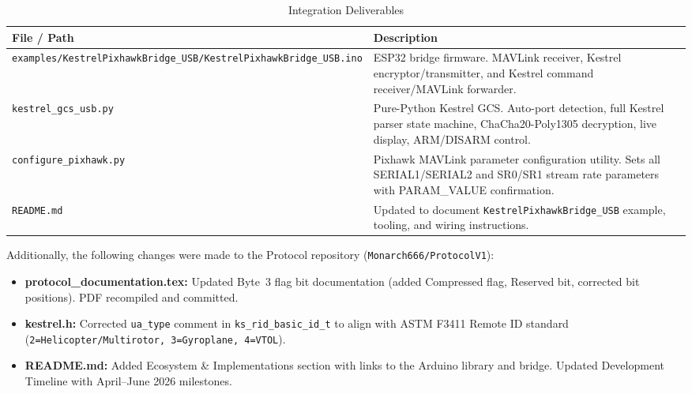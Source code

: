 \documentclass[11pt,a4paper]{article}
\begin{document}
\begin{table}[H]
    \centering
    \begin{tabularx}{\textwidth}{@{}lX@{}}
        \toprule
        \textbf{File / Path}       & \textbf{Description} \\
        \midrule
        \texttt{examples/KestrelPixhawkBridge\_USB/KestrelPixhawkBridge\_USB.ino}
            & ESP32 bridge firmware. MAVLink receiver, Kestrel
              encryptor/transmitter, and Kestrel command receiver/MAVLink
              forwarder. \\
        \texttt{kestrel\_gcs\_usb.py}
            & Pure-Python Kestrel GCS. Auto-port detection, full Kestrel
              parser state machine, ChaCha20-Poly1305 decryption, live
              display, ARM/DISARM control. \\
        \texttt{configure\_pixhawk.py}
            & Pixhawk MAVLink parameter configuration utility. Sets all
              SERIAL1/SERIAL2 and SR0/SR1 stream rate parameters with
              PARAM\_VALUE confirmation. \\
        \texttt{README.md}
            & Updated to document \texttt{KestrelPixhawkBridge\_USB} example,
              tooling, and wiring instructions. \\
        \bottomrule
    \end{tabularx}
    \caption{Integration Deliverables}
\end{table}

Additionally, the following changes were made to the Protocol repository
(\texttt{Monarch666/ProtocolV1}):

\begin{itemize}[noitemsep]
    \item \textbf{protocol\_documentation.tex:} Updated Byte~3 flag bit
          documentation (added Compressed flag, Reserved bit, corrected bit
          positions). PDF recompiled and committed.
    \item \textbf{kestrel.h:} Corrected \texttt{ua\_type} comment in
          \texttt{ks\_rid\_basic\_id\_t} to align with ASTM F3411 Remote ID
          standard (\texttt{2=Helicopter/Multirotor, 3=Gyroplane, 4=VTOL}).
    \item \textbf{README.md:} Added Ecosystem \& Implementations section with
          links to the Arduino library and bridge. Updated Development Timeline
          with April--June 2026 milestones.
\end{itemize}

\newpage
\end{document}
